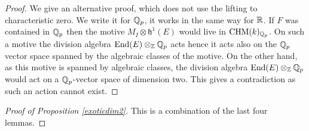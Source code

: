 \documentclass[11pt]{amsart}
\begin{document}
\begin{proof}
We give an alternative proof, which does not use the lifting to characteristic zero. We write it for $\mathbb{Q}_p$, it works in the same way for $\mathbb{R}$. If $F$ was contained in $\mathbb{Q}_p$ then the motive $M_{I}  \otimes \mathfrak{h}^1(E)$  would live in $\mathrm{CHM} (k)_{\mathbb{Q}_p}$. On such a motive the division algebra $\textnormal{End}(E)\otimes_{\mathbb{Z}} \mathbb{Q}_p$ acts hence it acts also on the $\mathbb{Q}_p$ vector space spanned by the algebraic classes of the motive. On the other hand, as this motive is spanned by algebraic classes, the division algebra  $\textnormal{End}(E)\otimes_{\mathbb{Z}} \mathbb{Q}_p$  would act on a $\mathbb{Q}_p$-vector space  of dimension two. This gives a contradiction as such an  action cannot exist.
\end{proof}
\begin{proof}[Proof of Proposition \ref{exoticdim2}] This is a combination of the  last four lemmas.
\end{proof}
\end{document}
